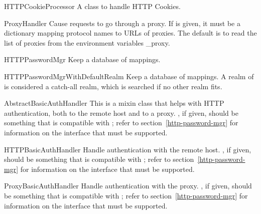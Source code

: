 \begin{classdesc}{HTTPCookieProcessor}{}
A class to handle HTTP Cookies.
\end{classdesc}

\begin{classdesc}{ProxyHandler}{}
Cause requests to go through a proxy.
If  is given, it must be a dictionary mapping
protocol names to URLs of proxies.
The default is to read the list of proxies from the environment
variables _proxy.
\end{classdesc}

\begin{classdesc}{HTTPPasswordMgr}{}
Keep a database of 
mappings.
\end{classdesc}

\begin{classdesc}{HTTPPasswordMgrWithDefaultRealm}{}
Keep a database of 
 mappings.
A realm of  is considered a catch-all realm, which is searched
if no other realm fits.
\end{classdesc}

\begin{classdesc}{AbstractBasicAuthHandler}{}
This is a mixin class that helps with HTTP authentication, both
to the remote host and to a proxy.
, if given, should be something that is compatible
with ; refer to section~\ref{http-password-mgr}
for information on the interface that must be supported.
\end{classdesc}

\begin{classdesc}{HTTPBasicAuthHandler}{}
Handle authentication with the remote host.
, if given, should be something that is compatible
with ; refer to section~\ref{http-password-mgr}
for information on the interface that must be supported.
\end{classdesc}

\begin{classdesc}{ProxyBasicAuthHandler}{}
Handle authentication with the proxy.
, if given, should be something that is compatible
with ; refer to section~\ref{http-password-mgr}
for information on the interface that must be supported.
\end{classdesc}

